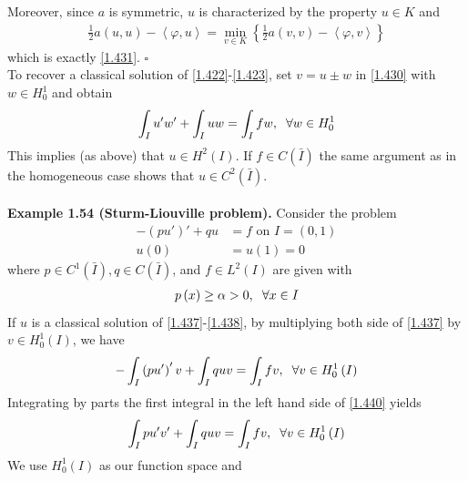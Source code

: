 \documentclass[a4paper,oneside]{article}
\numberwithin{equation}{section}
\begin{document}
Moreover, since $a$ is symmetric, $u$ is characterized by the property $u\in K$ and
\begin{align}
\frac{1}{2}a\left( {u,u} \right) - \left\langle {\varphi ,u} \right\rangle  = \mathop {\min }\limits_{v \in K} \left\{ {\frac{1}{2}a\left( {v,v} \right) - \left\langle {\varphi ,v} \right\rangle } \right\}
\end{align}
which is exactly \eqref{1.431}. \hfill $\square$\\

To recover a classical solution of \eqref{1.422}-\eqref{1.423}, set $v=u\pm w$ in \eqref{1.430} with $w\in H_0^1$ and obtain 
\begin{align}
\int_I {u'w'}  + \int_I {uw}  = \int_I {fw} ,\hspace{0.2cm}\forall w \in H_0^1
\end{align}
This implies (as above) that $u\in H^2\left(I\right)$. If $f\in C\left(\bar I\right)$ the same argument as in the homogeneous case shows that $u\in C^2\left(\bar I\right)$.\\
\\
\textbf{Example 1.54 (Sturm-Liouville problem).} Consider the problem
\begin{align}
\label{1.437}
 - \left( {pu'} \right)' + qu &= f\mbox{ on } I = \left( {0,1} \right)\\
u\left( 0 \right) &= u\left( 1 \right) = 0 \label{1.438}
\end{align}
where $p\in C^1\left(\bar I\right), q\in C\left(\bar I\right)$, and $f\in L^2\left(I\right)$ are given with
\begin{align}
\label{1.439}
p\left(x\right)\ge \alpha >0, \hspace{0.2cm} \forall x\in I
\end{align}
If $u$ is a classical solution of \eqref{1.437}-\eqref{1.438}, by multiplying both side of \eqref{1.437} by $v\in H_0^1\left(I\right)$, we have
\begin{align}
\label{1.440}
 - \int_I {\left( {pu'} \right)'v}  + \int_I {quv}  = \int_I {fv} , \hspace{0.2cm}\forall v \in H_0^1\left( I \right)
\end{align}
Integrating by parts the first integral in the left hand side of \eqref{1.440} yields
\begin{align}
\int_I {pu'v'}  + \int_I {quv}  = \int_I {fv} ,\hspace{0.2cm}\forall v \in H_0^1\left( I \right)
\end{align}
We use $H_0^1\left(I\right)$ as our function space and 
\end{document}
